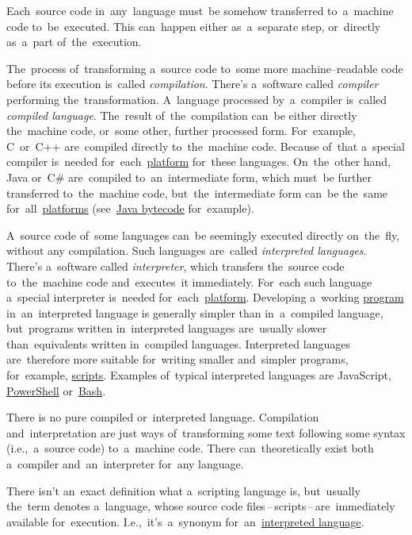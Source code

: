 \label{compiledinterpretedlanguages}
Each~source code in~any~language must~be somehow transferred to~a~machine code to~be~executed. This can~happen either as~a~separate step, or~directly as~a~part of~the~execution.

The~process of~transforming a~source code to~some more machine--readable code before its execution is~called \textit{compilation}. There's a~software called \textit{compiler} performing the~transformation. A~language processed by~a~compiler is~called \textit{compiled language}. The~result of~the~compilation can~be either directly the~machine code, or~some other, further processed form. For~example, \mbox{C~or~C++} are~compiled directly to~the~machine code. Because of~that a~special compiler is~needed for~each~\hyperref[platform]{platform} for~these languages. On~the~other hand, Java or~C\# are~compiled to~an~intermediate form, which must~be further transferred to~the~machine code, but~the~intermediate form can~be the~same for~all~\hyperref[platform]{platforms} (see~\hyperref[bytecode]{Java bytecode} for~example).

A~source code of~some languages can~be seemingly executed directly on~the~fly, without any compilation. Such languages are~called \textit{interpreted languages}. There's a~software called \textit{interpreter}, which transfers the~source code to~the~machine code and~executes~it immediately. For~each such language a~special interpreter is~needed for~each~\hyperref[platform]{platform}. Developing a~working \hyperref[applicationprocessprogramservicethread]{program} in~an~interpreted language is generally simpler than in~a~compiled language, but~programs written in~interpreted languages are~usually slower than~equivalents written in~compiled languages. Interpreted languages are~therefore more suitable for~writing smaller and~simpler programs, for~example, \hyperref[scriptinglanguages]{scripts}. Examples of~typical interpreted languages are JavaScript, \hyperref[powershell]{PowerShell} or~\hyperref[shbash]{Bash}.

\warning There is no pure compiled or~interpreted language. Compilation and~interpretation are just ways of~transforming some text following some syntax (i.e.,~a~source code) to~a~machine code. There can~theoretically exist both a~compiler and~an~interpreter for~any language.

\label{scriptinglanguages}
There isn't an~exact definition what a~scripting language is, but~usually the~term denotes a~language, whose source code files\,--\,scripts\,--\,are~immediately available for~execution. I.e.,~it's~a~synonym for~an~\hyperref[compiledinterpretedlanguages]{interpreted language}.

